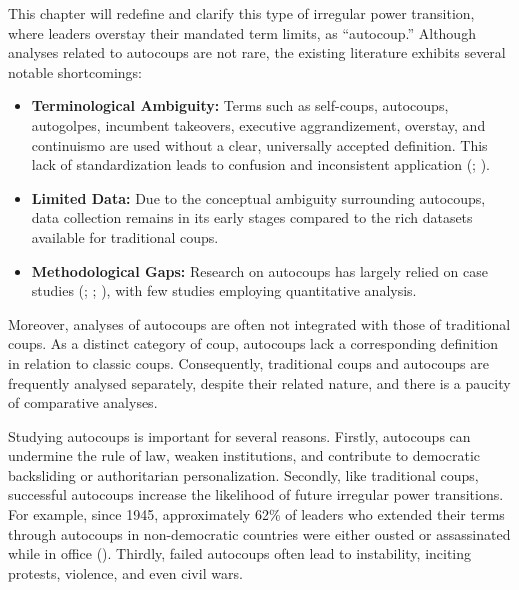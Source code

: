 \documentclass[
  12pt,
]{report}
\begin{document}
This chapter will redefine and clarify this type of irregular power
transition, where leaders overstay their mandated term limits, as
``autocoup.'' Although analyses related to autocoups are not rare, the
existing literature exhibits several notable shortcomings:

\begin{itemize}
\item
  \textbf{Terminological Ambiguity:} Terms such as self-coups,
  autocoups, autogolpes, incumbent takeovers, executive aggrandizement,
  overstay, and continuismo are used without a clear, universally
  accepted definition. This lack of standardization leads to confusion
  and inconsistent application
  (;
  ).
\item
  \textbf{Limited Data:} Due to the conceptual ambiguity surrounding
  autocoups, data collection remains in its early stages compared to the
  rich datasets available for traditional coups.
\item
  \textbf{Methodological Gaps:} Research on autocoups has largely relied
  on case studies (;
  ;
  ), with few studies employing quantitative analysis.
\end{itemize}

Moreover, analyses of autocoups are often not integrated with those of
traditional coups. As a distinct category of coup, autocoups lack a
corresponding definition in relation to classic coups. Consequently,
traditional coups and autocoups are frequently analysed separately,
despite their related nature, and there is a paucity of comparative
analyses.

Studying autocoups is important for several reasons. Firstly, autocoups
can undermine the rule of law, weaken institutions, and contribute to
democratic backsliding or authoritarian personalization. Secondly, like
traditional coups, successful autocoups increase the likelihood of
future irregular power transitions. For example, since 1945,
approximately 62\% of leaders who extended their terms through autocoups
in non-democratic countries were either ousted or assassinated while in
office (). Thirdly, failed
autocoups often lead to instability, inciting protests, violence, and
even civil wars.
\end{document}
